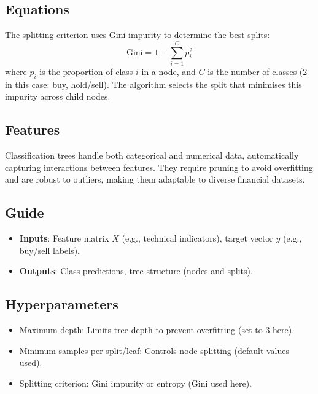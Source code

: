 \documentclass{article}
\begin{document}
\subsection{Equations}
The splitting criterion uses Gini impurity to determine the best splits:
\[
\text{Gini} = 1 - \sum_{i=1}^C p_i^2
\]
where \(p_i\) is the proportion of class \(i\) in a node, and \(C\) is the number of classes (2 in this case: buy, hold/sell). The algorithm selects the split that minimises this impurity across child nodes.

\subsection{Features}
Classification trees handle both categorical and numerical data, automatically capturing interactions between features. They require pruning to avoid overfitting and are robust to outliers, making them adaptable to diverse financial datasets.

\subsection{Guide}
\begin{itemize}
    \item \textbf{Inputs}: Feature matrix \(X\) (e.g., technical indicators), target vector \(y\) (e.g., buy/sell labels).
    \item \textbf{Outputs}: Class predictions, tree structure (nodes and splits).
\end{itemize}

\subsection{Hyperparameters}
\begin{itemize}
    \item Maximum depth: Limits tree depth to prevent overfitting (set to 3 here).
    \item Minimum samples per split/leaf: Controls node splitting (default values used).
    \item Splitting criterion: Gini impurity or entropy (Gini used here).
\end{itemize}
\end{document}
